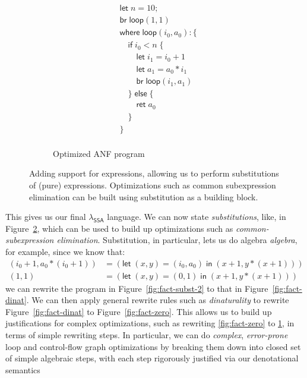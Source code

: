 \documentclass[acmsmall,screen,review]{acmart}
\newcommand{\ms}[1]{\ensuremath{\mathsf{#1}}}
\newcommand{\isotopessa}{\(\lambda_{\ms{SSA}}\)}
\begin{document}
\begin{figure}
\begin{subfigure}[t]{.31\textwidth}
\begin{align*}
      & \ms{let}\;n = 10; \\
      & \ms{br}\;\ms{loop}(1, 1) \\
      & \ms{where}\;\ms{loop}(i_0, a_0): \{\\
      & \quad \ms{if}\;i_0 < n\;\{ \\
      & \qquad \ms{let}\;i_1 = i_0 + 1 \\
      & \qquad \ms{let}\;a_1 = a_0 * i_1 \\
      & \qquad \ms{br}\;\ms{loop}(i_1, a_1) \\
      & \quad \}\;\ms{else}\;\{ \\
      & \qquad \ms{ret}\;a_0 \\
      & \quad \} \\
      & \} \\
    \end{align*}
    \caption{Optimized ANF program}
    \label{fig:fact-opt}
  \end{subfigure}
  \caption{
    Adding support for expressions, allowing us to perform substitutions of (pure) expressions.
    Optimizations such as common subexpression elimination can be built using substitution as a
    building block.
  }
  \Description{}
  \label{fig:fact-cse}
\end{figure}


This gives us our final \isotopessa{} language. We can now state
\textit{substitutions}, like, in Figure~\ref{fig:fact-cse}, which can be used to
build up optimizations such as \textit{common-subexpression elimination}.
Substitution, in particular, lets us do algebra \textit{algebra}, for example,
since we know that:
\begin{align*}
  (i_0 + 1, a_0 * (i_0 + 1)) &= (\ms{let}\;(x, y) = (i_0, a_0)\;\ms{in}\;(x + 1, y * (x + 1))) \\
  (1, 1) &= (\ms{let}\;(x, y) = (0, 1)\;\ms{in}\;(x + 1, y * (x + 1)))
\end{align*} 
we can rewrite the program in Figure~\ref{fig:fact-subst-2} to that in Figure~\ref{fig:fact-dinat}.
We can then apply general rewrite rules such as \textit{dinaturality} to rewrite
Figure~\ref{fig:fact-dinat} to Figure~\ref{fig:fact-zero}. This allows us to build up justifications
for complex optimizations, such as rewriting \ref{fig:fact-zero} to \ref{fig:fact-opt}, in terms of
simple rewriting steps. In particular, we can do \textit{complex}, \textit{error-prone} loop and
control-flow graph optimizations by breaking them down into closed set of simple algebraic steps,
with each step rigorously justified via our denotational semantics
\end{document}
